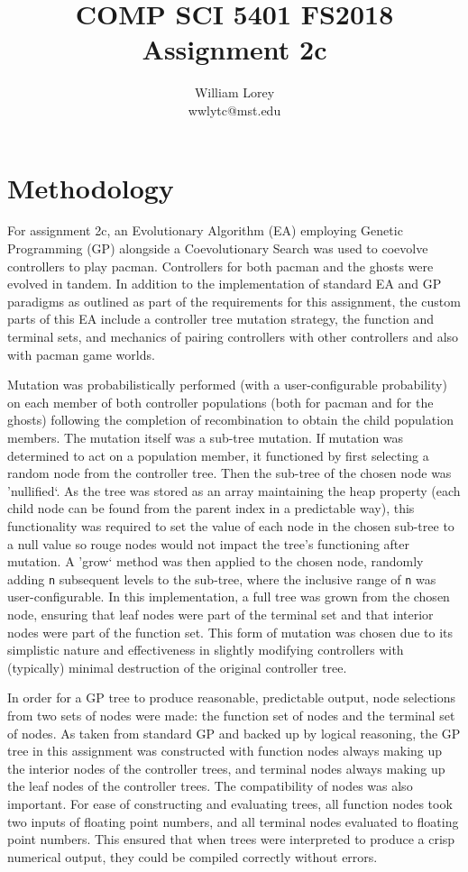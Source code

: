 \documentclass[11pt]{article}
\title{COMP SCI 5401 FS2018 Assignment 2c}
\author{William  Lorey \\ wwlytc@mst.edu}
\date{}
\begin{document}
\maketitle

\tableofcontents

\section{Methodology}
For assignment 2c, an Evolutionary Algorithm (EA) employing Genetic Programming (GP) alongside a 
Coevolutionary Search was used to coevolve controllers to play pacman. 
Controllers for both pacman and the ghosts were evolved in tandem.
In addition to the implementation of standard EA and GP paradigms as outlined as part of the requirements for this assignment, 
the custom parts of this EA include a controller tree mutation strategy, the function and terminal sets, and
mechanics of pairing controllers with other controllers and also with pacman game worlds.

Mutation was probabilistically performed (with a user-configurable probability) on each member of both
controller populations (both for pacman and for the ghosts) following the completion of recombination 
to obtain the child population members.
The mutation itself was a sub-tree mutation. If mutation was determined to act on a population member, 
it functioned by first selecting a random node from the controller tree. Then the sub-tree of the chosen
node was 'nullified`. As the tree was stored as an array maintaining the heap property (each child node 
can be found from the parent index in a predictable way), this functionality was required to set the value of 
each node in the chosen sub-tree to a null value so rouge nodes would not impact the tree's functioning after 
mutation. A 'grow` method was then applied to the chosen node, randomly adding \texttt{n} subsequent levels
to the sub-tree, where the inclusive range of \texttt{n} was user-configurable. In this implementation,
a full tree was grown from the chosen node, ensuring that leaf nodes were part of the terminal set and that
interior nodes were part of the function set. This form of mutation was chosen due to its simplistic 
nature and effectiveness in slightly modifying controllers with (typically) minimal destruction of the 
original controller tree.

In order for a GP tree to produce reasonable, predictable output, node selections from two sets of nodes were
made: the function set of nodes and the terminal set of nodes. As taken from standard GP and backed up by logical reasoning,
the GP tree in this assignment was constructed with function nodes always making up the interior nodes
of the controller trees, and terminal nodes always making up the leaf nodes of the controller trees. The compatibility of nodes
was also important. For ease of constructing and evaluating trees, all function nodes took two inputs of floating point
numbers, and all terminal nodes evaluated to floating point numbers. This
ensured that when trees were interpreted to produce a crisp numerical output, they could be compiled correctly without errors.
\end{document}
